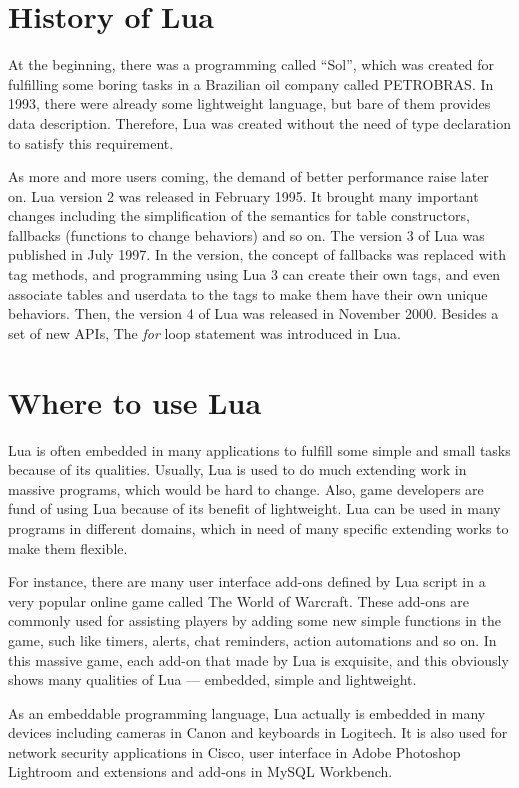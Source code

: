 \section{History of Lua}
At the beginning, there was a programming called ``Sol'', which was created for fulfilling some boring tasks in a Brazilian oil company called PETROBRAS. In 1993, there were already some lightweight language, but bare of them provides data description. Therefore, Lua was created without the need of type declaration to satisfy this requirement\cite{EOL}.

As more and more users coming, the demand of better performance raise later on. Lua version 2 was released in February 1995. It brought many important changes including the simplification of the semantics for table constructors, fallbacks (functions to change behaviors) and so on. The version 3 of Lua was published in July 1997. In the version, the concept of fallbacks was replaced with tag methods, and programming using Lua 3 can create their own tags, and even associate tables and userdata to the tags to make them have their own unique behaviors. Then, the version 4 of Lua was released in November 2000. Besides a set of new APIs, The \emph{for} loop statement was introduced in Lua.

\section{Where to use Lua}
Lua is often embedded in many applications to fulfill some simple and small tasks because of its qualities. Usually, Lua is used to do much extending work in massive programs, which would be hard to change. Also, game developers are fund of using Lua because of its benefit of lightweight\cite{AIL}. Lua can be used in many programs in different domains, which in need of many specific extending works to make them flexible. 

For instance, there are many user interface add-ons defined by Lua script in a very popular online game called The World of Warcraft\cite{WLA}. These add-ons are commonly used for assisting players by adding some new simple functions in the game, such like timers, alerts, chat reminders, action automations and so on. In this massive game, each add-on that made by Lua is exquisite, and this obviously shows many qualities of Lua --- embedded, simple and lightweight.

As an embeddable programming language, Lua actually is embedded in many devices including cameras in Canon and keyboards in Logitech. It is also used for network security applications in Cisco\cite{CISCO}, user interface in Adobe Photoshop Lightroom and extensions and add-ons in MySQL Workbench.

